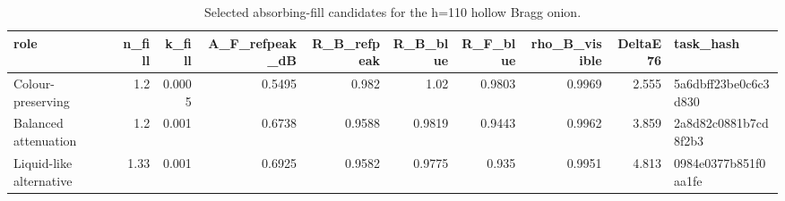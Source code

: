 \begin{table}
\caption{Selected absorbing-fill candidates for the h=110 hollow Bragg onion.}
\label{tab:selected_hollow_fill_candidates}
\begin{tabular}{lrrrrrrrrl}
\toprule
role & n\_fill & k\_fill & A\_F\_refpeak\_dB & R\_B\_refpeak & R\_B\_blue & R\_F\_blue & rho\_B\_visible & DeltaE76 & task\_hash \\
\midrule
Colour-preserving & 1.2 & 0.0005 & 0.5495 & 0.982 & 1.02 & 0.9803 & 0.9969 & 2.555 & 5a6dbff23be0c6c3d830 \\
Balanced attenuation & 1.2 & 0.001 & 0.6738 & 0.9588 & 0.9819 & 0.9443 & 0.9962 & 3.859 & 2a8d82c0881b7cd8f2b3 \\
Liquid-like alternative & 1.33 & 0.001 & 0.6925 & 0.9582 & 0.9775 & 0.935 & 0.9951 & 4.813 & 0984e0377b851f0aa1fe \\
\bottomrule
\end{tabular}
\end{table}
